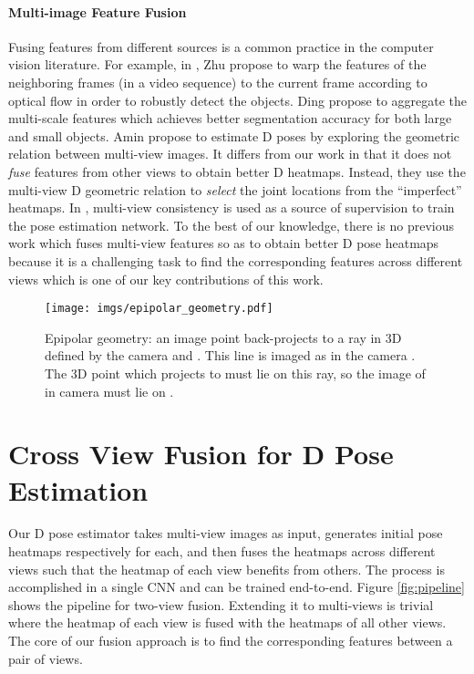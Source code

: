 \documentclass[10pt,twocolumn,letterpaper]{article}
\begin{document}
\paragraph{Multi-image Feature Fusion} Fusing features from different sources is a common practice in the computer vision literature. For example, in \cite{zhu2017flow}, Zhu \etal propose to warp the features of the neighboring frames (in a video sequence) to the current frame according to optical flow in order to robustly detect the objects. Ding \etal \cite{Ding_2018_CVPR} propose to aggregate the multi-scale features which achieves better segmentation accuracy for both large and small objects.  Amin \etal \cite{amin2013multi} propose to estimate D poses by exploring the geometric relation between multi-view images. It differs from our work in that it does not \emph{fuse} features from other views to obtain better D heatmaps. Instead, they use the multi-view D geometric relation to \emph{select} the joint locations from the  ``imperfect'' heatmaps. In \cite{jafarian2018monet}, multi-view consistency is used as a source of supervision to train the pose estimation network. To the best of our knowledge, there is no previous work which fuses multi-view features so as to obtain better D pose heatmaps because it is a challenging task to find the corresponding features across different views which is one of our key contributions of this work.

\begin{figure}
	\centering
	\texttt{[image: imgs/epipolar\_geometry.pdf]}
	\caption{Epipolar geometry: an image point  back-projects to a ray in 3D defined by the camera  and . This line is imaged as  in the camera . The 3D point  which projects to  must lie on this ray, so the image of  in camera  must lie on .}
	\label{fig:epipolar_geometry}
\end{figure}


\section{Cross View Fusion for D Pose Estimation}
Our D pose estimator takes multi-view images as input, generates initial pose heatmaps respectively for each, and then
fuses the heatmaps across different views such that the heatmap of each view benefits from others. The process is accomplished in a single CNN and can be trained end-to-end. Figure \ref{fig:pipeline} shows the pipeline for two-view fusion. Extending it to multi-views is trivial where the heatmap of each view is fused with the heatmaps of all other views. The core of our fusion approach is to find the corresponding features between a pair of views.
\end{document}
